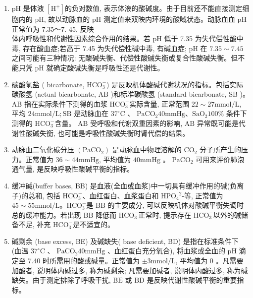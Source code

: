 \documentclass[10pt]{article}
\begin{document}
\begin{enumerate}
  \item $\mathrm{pH}$ 是体液 $\left[\mathrm{H}^{+}\right]$的负对数值, 表示体液的酸碱度。由于目前还不能直接测定细胞内的 $\mathrm{pH}$, 故以动脉血的 $\mathrm{pH}$ 测定值来双映内环境的酸㖪状态。动脉血血 $\mathrm{pH}$ 正常值为 7.35～7. 45, 反映\\
体内呼吸性和代谢性因素综合作用的结果。若 $\mathrm{pH}$ 低于 7.35 为失代偿性酸中毒, 存在酸血症;若高于 7.45 为失代偿性碱中毒, 有碱血症; $\mathrm{pH}$ 在 $7.35 \sim 7.45$ 之间可能有三种情况: 无酸碱失衡、代偿性酸碱失衡或复合性酸碱失衡。但不能只凭 $\mathrm{pH}$ 就确定酸碱失衡是呼吸性还是代谢性。

  \item 碳酸氢盐 ( bicarbonate, $\mathrm{HCO}_{3}^{-}$) 是反映机体酸碱代谢状况的指标。包括实际碳酸氢 (actual bicarbonate, $\mathrm{AB}$ )和标准碳酸氢 (standard bicarbonate, $\mathrm{SB}$ )。 $\mathrm{AB}$ 指在实际条件下测得的血浆 $\mathrm{HCO}_{3}^{-}$实际含量, 正常范围 $22 \sim 27 \mathrm{mmol} / \mathrm{L}$, 平均 $24 \mathrm{mmol} / \mathrm{L} ; \mathrm{SB}$ 是动脉血在 $37^{\circ} \mathrm{C}$ 、 $\mathrm{PaCO}_{2} 40 \mathrm{mmHg} 、 \mathrm{SaO}_{2} 100 \%$ 条件下测得的 $\mathrm{HCO}_{3}^{-}$含量。 $\mathrm{AB}$ 受呼吸和代谢双重因素的影响, $\mathrm{AB}$ 异常既可能是代谢性酸碱失衡, 也可能是呼吸性酸碱失衡时肾代偿的结果。

  \item 动脉血二氧化碳分压 $\left(\mathrm{PaCO}_{2}\right)$ 是动脉血中物理溶解的 $\mathrm{CO}_{2}$ 分子所产生的压力。正常值为 $36 \sim 44 \mathrm{mmHg}$, 平均值为 $40 \mathrm{mmHg}$ 。 $\mathrm{PaCO}_{2}$ 可用来评价肺泡通气量, 是反映呼吸性酸碱平衡的指标。

  \item 缓冲碱(buffer bases, BB) 是血液(全血或血浆)中一切具有缓冲作用的碱(负离子)的总和, 包括 $\mathrm{HCO}_{3}^{-}$、血红蛋白、血浆蛋白和 $\mathrm{HPO}_{4}{ }^{2}$-等, 正常值为 $45 \sim 55 \mathrm{mmol} / \mathrm{L} 。 \mathrm{HCO}_{3}^{-}$是 $\mathrm{BB}$ 的主要成分, 可以反映机体对酸碱平衡失调时总的缓冲能力。若出现 $\mathrm{BB}$ 降低而 $\mathrm{HCO}_{3}^{-}$正常时, 提示存在 $\mathrm{HCO}_{3}^{-}$以外的碱储备不足, 补充 $\mathrm{HCO}_{3}^{-}$是不适宜的。

  \item 碱剩余 (base excess, BE) 及碱缺失( base deficient, BD) 是指在标准条件下 (血温 $37^{\circ} \mathrm{C}$ 、 $\mathrm{PaCO}_{2} 40 \mathrm{mmHg}$ 、血红蛋白充分氧合), 将血浆或全血的 $\mathrm{pH}$ 滴定至 7.40 时所需用的酸或碱量。正常值为 $\pm 3 \mathrm{mmol} / \mathrm{L}$, 平均值为 0 。凡需要加酸者, 说明体内碱过多, 称为碱剩余; 凡需要加碱者, 说明体内酸过多, 称为碱缺失。由于测定排除了呼吸干扰, $\mathrm{BE}$ 或 $\mathrm{BD}$ 是反映代谢性酸碱平衡的重要指标。


\end{enumerate}
\end{document}
